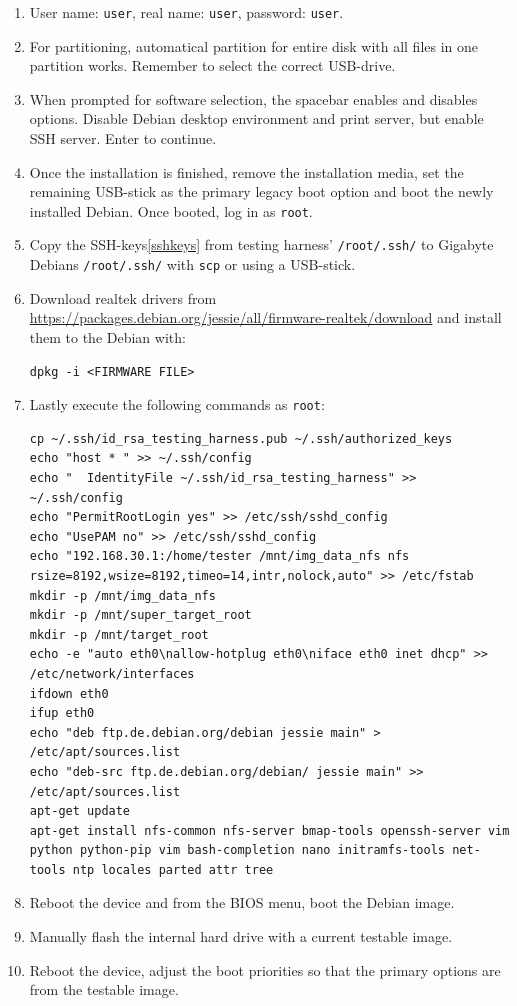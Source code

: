 \documentclass[a4paper,11pt]{article}
\newcommand{\cmd}[1]{\texttt{#1}}
\begin{document}
\begin{enumerate}
\item User name: \cmd{user}, real name: \cmd{user}, password: \cmd{user}.

\item For partitioning, automatical partition for entire disk with all files in one partition works. Remember to select the correct USB-drive.

\item When prompted for software selection, the spacebar enables and disables options. Disable Debian desktop environment and print server, but enable SSH server. Enter to continue.

\item Once the installation is finished, remove the installation media, set the remaining USB-stick as the primary legacy boot option and boot the newly installed Debian. Once booted, log in as \cmd{root}.

\item Copy the SSH-keys\ref{sshkeys} from testing harness' \cmd{/root/.ssh/} to Gigabyte Debians \cmd{/root/.ssh/} with \cmd{scp} or using a USB-stick.

\item Download realtek drivers from \url{https://packages.debian.org/jessie/all/firmware-realtek/download} and install them to the Debian with:

\begin{lstlisting}
dpkg -i <FIRMWARE FILE>
\end{lstlisting}

\item Lastly execute the following commands as \cmd{root}:

\begin{lstlisting}
cp ~/.ssh/id_rsa_testing_harness.pub ~/.ssh/authorized_keys
echo "host * " >> ~/.ssh/config
echo "  IdentityFile ~/.ssh/id_rsa_testing_harness" >> ~/.ssh/config
echo "PermitRootLogin yes" >> /etc/ssh/sshd_config
echo "UsePAM no" >> /etc/ssh/sshd_config
echo "192.168.30.1:/home/tester /mnt/img_data_nfs nfs	rsize=8192,wsize=8192,timeo=14,intr,nolock,auto" >> /etc/fstab
mkdir -p /mnt/img_data_nfs
mkdir -p /mnt/super_target_root
mkdir -p /mnt/target_root
echo -e "auto eth0\nallow-hotplug eth0\niface eth0 inet dhcp" >> /etc/network/interfaces
ifdown eth0
ifup eth0
echo "deb ftp.de.debian.org/debian jessie main" > /etc/apt/sources.list
echo "deb-src ftp.de.debian.org/debian/ jessie main" >> /etc/apt/sources.list
apt-get update
apt-get install nfs-common nfs-server bmap-tools openssh-server vim python python-pip vim bash-completion nano initramfs-tools net-tools ntp locales parted attr tree
\end{lstlisting}


\item Reboot the device and from the BIOS menu, boot the Debian image.

\item Manually flash the internal hard drive with a current testable image.

\item Reboot the device, adjust the boot priorities so that the primary options are from the testable image.
\end{enumerate}
\end{document}

